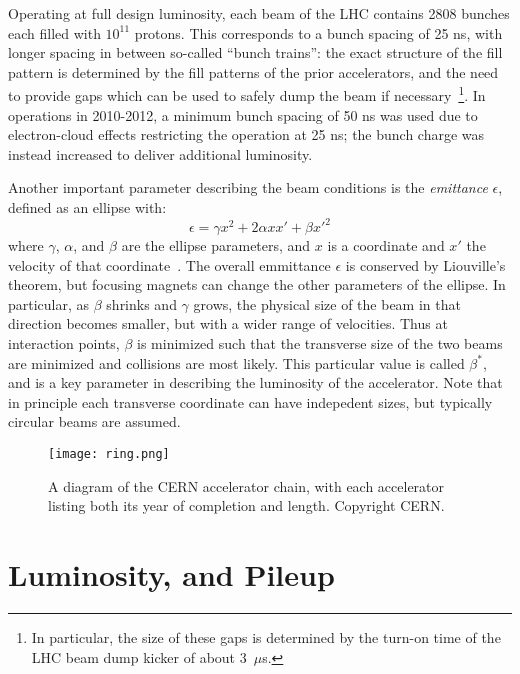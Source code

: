 Operating at full design luminosity, each beam of the LHC contains 2808 bunches each filled with $10^{11}$ protons. This corresponds to a bunch spacing of 25 ns, with longer spacing in between so-called ``bunch trains'': the exact structure of the fill pattern is determined by the fill patterns of the prior accelerators, and the need to provide gaps which can be used to safely dump the beam if necessary~\cite{lhc-bunches}\footnote{In particular, the size of these gaps is determined by the turn-on time of the LHC beam dump kicker of about 3~$\mu$s.}. In operations in 2010-2012, a minimum bunch spacing of 50 ns was used due to electron-cloud effects restricting the operation at 25 ns; the bunch charge was instead increased to deliver additional luminosity. 

Another important parameter describing the beam conditions is the \textit{emittance} $\epsilon$, defined as an ellipse with:
%
\begin{equation}
\epsilon = \gamma x^2 + 2 \alpha x x' + \beta x'^2
\end{equation}
%
where $\gamma$, $\alpha$, and $\beta$ are the ellipse parameters, and $x$ is a coordinate and $x'$ the velocity of that coordinate~\cite{accelerator-book}. The overall emmittance $\epsilon$ is conserved by Liouville's theorem, but focusing magnets can change the other parameters of the ellipse. In particular, as $\beta$ shrinks and $\gamma$ grows, the physical size of the beam in that direction becomes smaller, but with a wider range of velocities. Thus at interaction points, $\beta$ is minimized such that the transverse size of the two beams are minimized and collisions are most likely. This particular value is called $\beta^*$, and is a key parameter in describing the luminosity of the accelerator. Note that in principle each transverse coordinate can have indepedent sizes, but typically circular beams are assumed.


\begin{figure}
\centering
\texttt{[image: ring.png]}
\label{fig:lhc:ring}
\caption{A diagram of the CERN accelerator chain, with each accelerator listing both its year of completion and length. Copyright CERN.}
\end{figure}


\section{Luminosity, and Pileup}
\label{lhc:luminosity-and-pileup}

